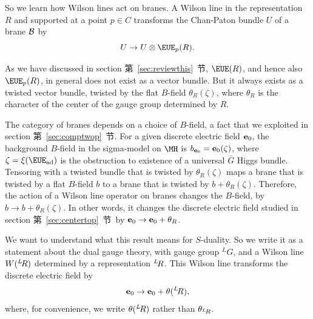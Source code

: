 So we learn how Wilson lines act on branes.  A Wilson line in the
representation $R$ and supported at a point $p\in C$ transforms
the Chan-Paton bundle $U$ of a brane ${\cal B}$ by %
\setcounter{equation}{6}
\begin{equation}\label{eq:yuq}
U\to
U\otimes {\EUE}_p(R).
\end{equation}

\par{}

As we have discussed in section 第~\ref{sec:reviewthis}~节,  ${\EUE}(R)$, and
hence also ${\EUE}_p(R)$, in general does not exist as a vector
bundle. But it always exists as a twisted vector bundle, twisted
by the flat $B$-field $\theta_{R}(\zeta)$, where $\theta_{R}$  is
the character of the center of the gauge group determined by $R$.

The category of branes depends on a choice of $B$-field, a fact
that we exploited in section 第~\ref{sec:comptwop}~节. For a given discrete
electric field ${\bf e}_0$, the background $B$-field in the
sigma-model on $\MH$ is $b_{{\bf e}_0}={\bf e}_0(\zeta)$, where
$\zeta=\xi({\EUE}_{\rm{ad}})$ is the obstruction to existence of a
universal $\bar G$ Higgs bundle. Tensoring with a twisted bundle
that is twisted by $\theta_R(\zeta)$ maps a brane that is twisted
by a flat $B$-field $b$ to a brane that is twisted by
$b+\theta_R(\zeta).$ Therefore, the action of a Wilson line
operator on branes changes the $B$-field, by $b\to
b+\theta_R(\zeta)$.  In other words, it changes the discrete
electric field studied in section 第~\ref{sec:centertop}~节\ by ${\bf e}_0\to
{\bf e}_0+\theta_R$.

We want to understand what this result means for $S$-duality.  So
we write it as a statement about the dual gauge theory, with gauge
group $^ LG$, and a Wilson line $W(^L\negthinspace R)$ determined
by a representation $^L\negthinspace R$.  This Wilson line
transforms the discrete electric field by %
\setcounter{equation}{7}
\begin{equation}\label{eq:nuko}
{\bf e}_0\to
{\bf e}_0+\theta(^L\negthinspace R),
\end{equation}
 where, for convenience, we
write $\theta(^L\negthinspace R)$ rather than
$\theta_{^L\negthinspace R}$.

